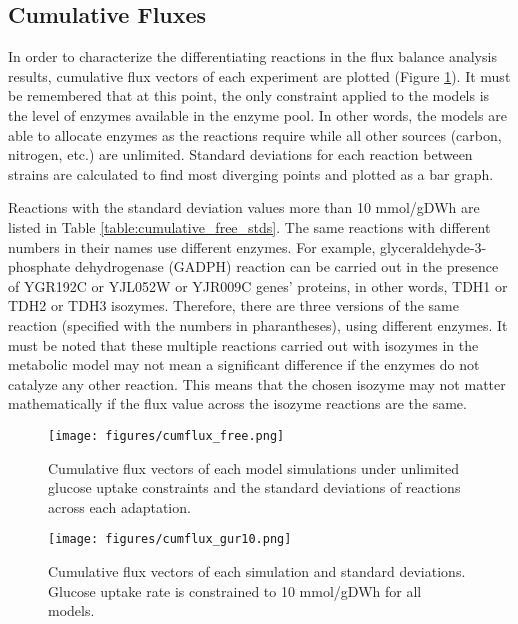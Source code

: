  \subsection{Cumulative Fluxes}

In order to characterize the differentiating reactions in the flux balance analysis results, cumulative flux vectors of each experiment are plotted (Figure \ref{fig:cumflux_free}). It must be remembered that at this point, the only constraint applied to the models is the level of enzymes available in the enzyme pool. In other words, the models are able to allocate enzymes as the reactions require while all other sources (carbon, nitrogen, etc.) are unlimited. Standard deviations for each reaction between strains are calculated to find most diverging points and plotted as a bar graph.

Reactions with the standard deviation values more than 10 mmol/gDWh are listed in Table \ref{table:cumulative_free_stds}. The same reactions with different numbers in their names use different enzymes. For example, glyceraldehyde-3-phosphate dehydrogenase (GADPH) reaction can be carried out in the presence of YGR192C or YJL052W or YJR009C genes' proteins, in other words, TDH1 or TDH2 or TDH3 isozymes. Therefore, there are three versions of the same reaction (specified with the numbers in pharantheses), using different enzymes. It must be noted that these multiple reactions carried out with isozymes in the metabolic model may not mean a significant difference if the enzymes do not catalyze any other reaction. This means that the chosen isozyme may not matter mathematically if the flux value across the isozyme reactions are the same.

\begin{figure}[H]
  \begin{center}
  \texttt{[image: figures/cumflux\_free.png]}
  \caption[Cumulative flux vectors of each model simulations under unlimited glucose uptake constraints and the standard deviations of reactions across each adaptation]{Cumulative flux vectors of each model simulations under unlimited glucose uptake constraints and the standard deviations of reactions across each adaptation.}
  \label{fig:cumflux_free}
  \end{center}
\end{figure}

\begin{figure}[H]
  \begin{center}
  \texttt{[image: figures/cumflux\_gur10.png]}
  \caption[Cumulative flux vectors of each experiment when glucose uptake rate is constrained]{Cumulative flux vectors of each simulation and standard deviations. Glucose uptake rate is constrained to 10 mmol/gDWh for all models. }
  \label{fig:cumflux_gur10}
  \end{center}
\end{figure}


